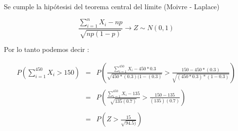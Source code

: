 \documentclass[10pt]{article}
\begin{document}
    \begin{flushleft}
   		Se cumple la hip\'otesisi del teorema central del l\'imite (Moivre - Laplace)
   	\end{flushleft}
   	
    \begin{equation*}
	   	\displaystyle\frac{\sum_{i=1}^{n} X_i -np}{\sqrt{np\left(1-p\right)}} \longrightarrow Z\sim N (0,1)
	\end{equation*}
    \begin{flushleft}
	   	Por lo tanto podemos decir : 
    \end{flushleft}
   	\begin{equation*}
	   	\begin{array}{rcl}
	   		\displaystyle P\left(\sum_{i=1}^{450}X_{i} > 150 \right) & = & \displaystyle P\left(\frac{\sum_{i=1}^{450}X_{i} - 450 * 0.3}{\sqrt{ 450 * (0.3)(1-(0.3)}}  > \frac{150 - 450 * (0.3)}{\sqrt{(450 * 0.3)*(1- 0.3)}}\right) 
	   	  	\\
	   	    \\
	   		& = & \displaystyle P\left(\frac{\sum_{i=1}^{450}X_{i} - 135}{\sqrt{135(0.7)}}  > \frac{150 - 135}{(135)(0.7)}\right) 
	   		\\
	   		\\
	   		& = & 	\displaystyle P\left(Z > \frac{15}{\sqrt{94.5)}}\right) 
	   	\end{array}
    \end{equation*}
   	
\end{document}
